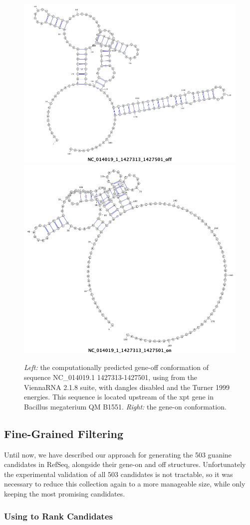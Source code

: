 \begin{figure}[!ht]
  \centering
    \includegraphics[width=.45\textwidth]{Figures/Ribofinder/NC_014019_1_1427313_1427501_off.png}
    \hfill
    \includegraphics[width=.45\textwidth]{Figures/Ribofinder/NC_014019_1_1427313_1427501_on.png}
    \caption{{\em Left:} the computationally predicted gene-off conformation of sequence NC\_014019.1 1427313-1427501, using  from the ViennaRNA 2.1.8 suite, with dangles disabled and the Turner 1999 energies. This sequence is located upstream of the xpt gene in Bacillus megaterium QM B1551. {\em Right:} the gene-on conformation.}
  \label{fig:example_ss}
\end{figure}

\subsection{Fine-Grained Filtering} \label{sub:fine}

Until now, we have described our approach for generating the 503 guanine \rb candidates in RefSeq, alongside their gene-on and off structures. Unfortunately the experimental validation of all 503 candidates is not tractable, so it was necessary to reduce this collection again to a more manageable size, while only keeping the most promising candidates.

\subsubsection{Using \foldalign to Rank Candidates} \label{ssub:foldalign}
